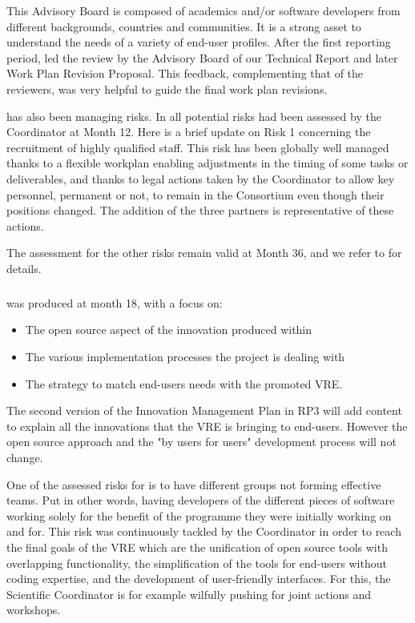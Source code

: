 This Advisory Board is composed of academics and/or software
developers from different backgrounds, countries and communities. It
is a strong asset to understand the needs of a variety of end-user
profiles. After the first reporting period,  led the review
by the Advisory Board of our Technical Report and later Work Plan
Revision Proposal. This feedback, complementing that of the reviewers,
was very helpful to guide the final work plan revisions.

 has also been managing risks. In 
all potential risks had been assessed by the Coordinator at Month 12.
Here is a brief update on Risk 1 concerning the recruitment of highly
qualified staff. This risk has been globally well managed thanks to a
flexible workplan enabling adjustments in the timing of some tasks or
deliverables, and thanks to legal actions taken by the Coordinator to
allow key personnel, permanent or not, to remain in the Consortium
even though their positions changed. The addition of the three
partners is representative of these actions.

The assessment for the
other risks remain valid at Month 36, and we refer to
 for details.

\subparagraph{}

 was produced at month 18, with a focus on:

\begin{itemize}
\item{The open source aspect of the innovation produced within \ODK}
\item{The various implementation processes the project is dealing with}
\item{The strategy to match end-users needs with the promoted VRE}.
\end{itemize}

The second version of the Innovation Management Plan in RP3 will add content
to explain all the innovations that the VRE is bringing to end-users.
However the open source approach and the "by users for users"
development process will not change.

One of the assessed risks for
\ODK is to have different groups not forming effective teams. Put in
other words, having developers of the different pieces of software
working solely for the benefit of the programme they were initially
working on and for. This risk was continuously tackled by the
Coordinator in order to reach the final goals of the VRE which are the
unification of open source tools with overlapping functionality, the
simplification of the tools for end-users without coding expertise,
and the development of user-friendly interfaces. For this, the
Scientific Coordinator is for example wilfully pushing for joint
actions and workshops.

